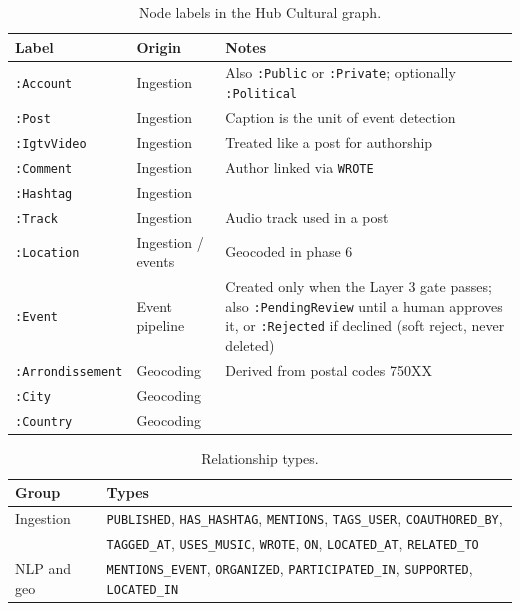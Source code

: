 \documentclass[12pt, a4paper]{report}
\begin{document}
\begin{table}[htbp]
\centering
\caption{Node labels in the Hub Cultural graph.}
\small
\begin{tabular}{@{}p{3.3cm}p{2.6cm}p{9.4cm}@{}}
\toprule
Label & Origin & Notes \\
\midrule
\texttt{:Account} & Ingestion & Also \texttt{:Public} or \texttt{:Private}; optionally \texttt{:Political} \\
\texttt{:Post} & Ingestion & Caption is the unit of event detection \\
\texttt{:IgtvVideo} & Ingestion & Treated like a post for authorship \\
\texttt{:Comment} & Ingestion & Author linked via \texttt{WROTE} \\
\texttt{:Hashtag} & Ingestion & \\
\texttt{:Track} & Ingestion & Audio track used in a post \\
\texttt{:Location} & Ingestion / events & Geocoded in phase 6 \\
\texttt{:Event} & Event pipeline & Created only when the Layer 3 gate passes; also \texttt{:PendingReview} until a human approves it, or \texttt{:Rejected} if declined (soft reject, never deleted) \\
\texttt{:Arrondissement} & Geocoding & Derived from postal codes 750XX \\
\texttt{:City} & Geocoding & \\
\texttt{:Country} & Geocoding & \\
\bottomrule
\end{tabular}
\end{table}

\begin{table}[htbp]
\centering
\caption{Relationship types.}
\small
\begin{tabular}{ll}
\toprule
Group & Types \\
\midrule
Ingestion & \texttt{PUBLISHED}, \texttt{HAS\_HASHTAG}, \texttt{MENTIONS},
\texttt{TAGS\_USER}, \texttt{COAUTHORED\_BY}, \\
& \texttt{TAGGED\_AT}, \texttt{USES\_MUSIC}, \texttt{WROTE}, \texttt{ON},
\texttt{LOCATED\_AT}, \texttt{RELATED\_TO} \\
NLP and geo & \texttt{MENTIONS\_EVENT}, \texttt{ORGANIZED},
\texttt{PARTICIPATED\_IN}, \texttt{SUPPORTED}, \texttt{LOCATED\_IN} \\
\bottomrule
\end{tabular}
\end{table}
\end{document}
